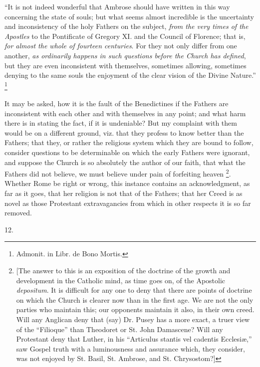 ``It is not indeed wonderful that Ambrose should have written
in this way concerning the state of souls; but what seems almost
incredible is the uncertainty and inconsistency of the holy Fathers on
the subject, \emph{from the very times of the Apostles} to the
Pontificate of Gregory XI. and the Council of Florence; that is, \emph{for
almost the whole of fourteen centuries}. For they not only differ
from one another, \emph{as ordinarily happens in such questions before
the Church has defined}, but they are even inconsistent with
themselves, sometimes allowing, sometimes denying to the same souls
the enjoyment of the clear vision of the Divine Nature.'' \footnote{Admonit. in Libr. de Bono Mortis.}

It may be asked, how it is the fault of the Benedictines if the
Fathers are inconsistent with each other and with themselves in any
point; and what harm there is in stating the fact, if it is
undeniable? But my complaint with them would be on a different ground,
viz. that they profess to know better than the Fathers; that they, or
rather the religious system which they are bound to follow, consider
questions to be determinable on which the early Fathers were
ignorant, and suppose the Church is so absolutely the author of our
faith, that what the Fathers did not believe, we must believe under
pain of forfeiting heaven \footnote{[The answer to this is an exposition of
the doctrine of the growth and development in the Catholic mind, as
time goes on, of the Apostolic \emph{depositum}. It is difficult for
any one to deny that there are points of doctrine on which the Church
is clearer now than in the first age. We are not the only parties who
maintain this; our opponents maintain it also, in their own creed.
Will any Anglican deny that (say) Dr. Pusey has a more exact, a truer
view of the ``Filioque'' than Theodoret or St. John Damascene?
Will any Protestant deny that Luther, in his ``Articulus stantis
vel cadentis Ecclesiæ,'' saw Gospel truth with a luminousness and
assurance which, they consider, was not enjoyed by St. Basil, St.
Ambrose, and St. Chrysostom?]}.
Whether Rome be right or wrong, this instance contains an
acknowledgment, as far as it goes, that her religion is not that of
the Fathers; that her Creed is as novel as those Protestant
extravagancies from which in other respects it is so far removed.

12.

